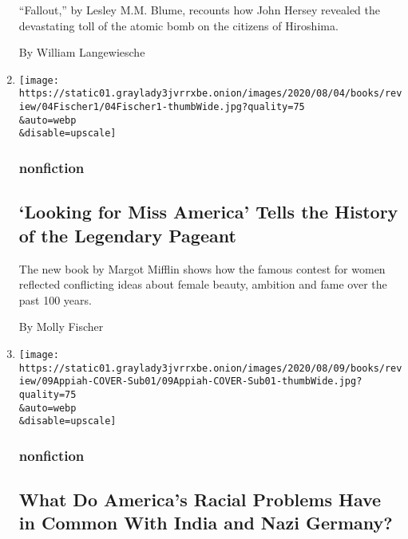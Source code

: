 \begin{enumerate}
  ``Fallout,'' by Lesley M.M. Blume, recounts how John Hersey revealed
  the devastating toll of the atomic bomb on the citizens of Hiroshima.

  By William Langewiesche
\item
  \href{/2020/08/04/books/review/looking-for-miss-america-margot-mifflin.html}{}

  \texttt{[image: https://static01.graylady3jvrrxbe.onion/images/2020/08/04/books/review/04Fischer1/04Fischer1-thumbWide.jpg?quality=75\\\&auto=webp\\\&disable=upscale]}

  \hypertarget{nonfiction-1}{%
  \subsubsection{nonfiction}\label{nonfiction-1}}

  \hypertarget{looking-for-miss-america-tells-the-history-of-the-legendary-pageant}{%
  \subsection{`Looking for Miss America' Tells the History of the
  Legendary
  Pageant}\label{looking-for-miss-america-tells-the-history-of-the-legendary-pageant}}

  The new book by Margot Mifflin shows how the famous contest for women
  reflected conflicting ideas about female beauty, ambition and fame
  over the past 100 years.

  By Molly Fischer
\item
  \href{/2020/08/04/books/review/caste-isabel-wilkerson.html}{}

  \texttt{[image: https://static01.graylady3jvrrxbe.onion/images/2020/08/09/books/review/09Appiah-COVER-Sub01/09Appiah-COVER-Sub01-thumbWide.jpg?quality=75\\\&auto=webp\\\&disable=upscale]}

  \hypertarget{nonfiction-2}{%
  \subsubsection{nonfiction}\label{nonfiction-2}}

  \hypertarget{what-do-americas-racial-problems-have-in-common-with-india-and-nazi-germany}{%
  \subsection{What Do America's Racial Problems Have in Common With
  India and Nazi
  Germany?}\label{what-do-americas-racial-problems-have-in-common-with-india-and-nazi-germany}}


\end{enumerate}
